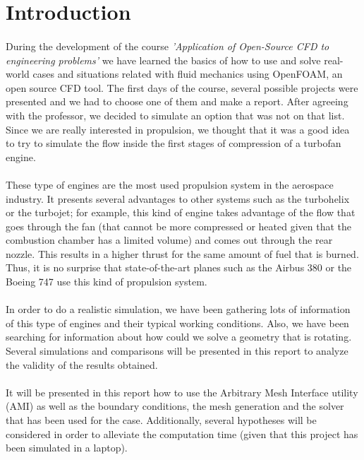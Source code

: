 \section{Introduction}

\paragraph{}During the development of the course \textit{'Application of Open-Source CFD to engineering problems'} we have learned the basics of how to use and solve real-world cases and situations related with fluid mechanics using OpenFOAM, an open source CFD tool. The first days of the course, several possible projects were presented and we had to choose one of them and make a report. After agreeing with the professor, we decided to simulate an option that was not on that list. Since we are really interested in propulsion, we thought that it was a good idea to try to simulate the flow inside the first stages of compression of a turbofan engine.

\paragraph{}These type of engines are the most used propulsion system in the aerospace industry. It presents several advantages to other systems such as the turbohelix or the turbojet; for example, this kind of engine takes advantage of the flow that goes through the fan (that cannot be more compressed or heated given that the combustion chamber has a limited volume) and comes out through the rear nozzle. This results in a higher thrust for the same amount of fuel that is burned. Thus, it is no surprise that state-of-the-art planes such as the Airbus 380 or the Boeing 747 use this kind of propulsion system.

\paragraph{}In order to do a realistic simulation, we have been gathering lots of information of this type of engines and their typical working conditions. Also, we have been searching for information about how could we solve a geometry that is rotating. Several simulations and comparisons will be presented in this report to analyze the validity of the results obtained. 

\paragraph{}It will be presented in this report how to use the Arbitrary Mesh Interface utility (AMI) as well as the boundary conditions, the mesh generation and the solver that has been used for the case. Additionally, several hypotheses will be considered in order to alleviate the computation time (given that this project has been simulated in a laptop).

